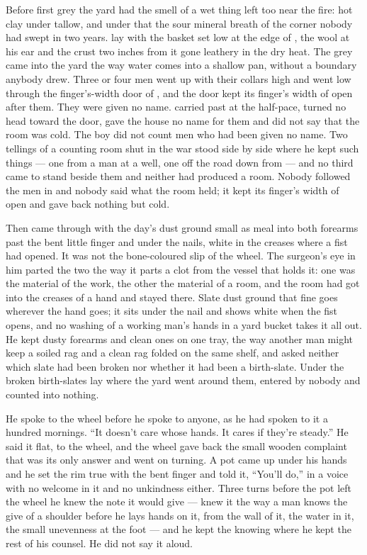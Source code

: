 
Before first grey the yard had the smell of a wet thing left too near the fire: hot clay under tallow, and under that the sour mineral breath of the corner nobody had swept in two years.  lay with the basket set low at the edge of , the wool at his ear and the crust two inches from it gone leathery in the dry heat. The grey came into the yard the way water comes into a shallow pan, without a boundary anybody drew. Three or four men went up  with their collars high and went low through the finger's-width door of , and the door kept its finger's width of open after them. They were given no name.  carried past at the half-pace, turned no head toward the door, gave the house no name for them and did not say that the room was cold. The boy did not count men who had been given no name. Two tellings of a counting room shut in the war stood side by side where he kept such things --- one from a man at a well, one off the road down from  --- and no third came to stand beside them and neither had produced a room. Nobody followed the men in and nobody said what the room held; it kept its finger's width of open and gave back nothing but cold.

Then  came through with the day's dust ground small as meal into both forearms past the bent little finger and under the nails, white in the creases where a fist had opened. It was not the bone-coloured slip of the wheel. The surgeon's eye in him parted the two the way it parts a clot from the vessel that holds it: one was the material of the work, the other the material of a room, and the room had got into the creases of a hand and stayed there. Slate dust ground that fine goes wherever the hand goes; it sits under the nail and shows white when the fist opens, and no washing of a working man's hands in a yard bucket takes it all out. He kept dusty forearms and clean ones on one tray, the way another man might keep a soiled rag and a clean rag folded on the same shelf, and asked neither which slate had been broken nor whether it had been a birth-slate. Under  the broken birth-slates lay where the yard went around them, entered by nobody and counted into nothing.

He spoke to the wheel before he spoke to anyone, as he had spoken to it a hundred mornings. “It doesn't care whose hands. It cares if they're steady.” He said it flat, to the wheel, and the wheel gave back the small wooden complaint that was its only answer and went on turning. A pot came up under his hands and he set the rim true with the bent finger and told it, “You'll do,” in a voice with no welcome in it and no unkindness either. Three turns before the pot left the wheel he knew the note it would give --- knew it the way a man knows the give of a shoulder before he lays hands on it, from the wall of it, the water in it, the small unevenness at the foot --- and he kept the knowing where he kept the rest of his counsel. He did not say it aloud.

